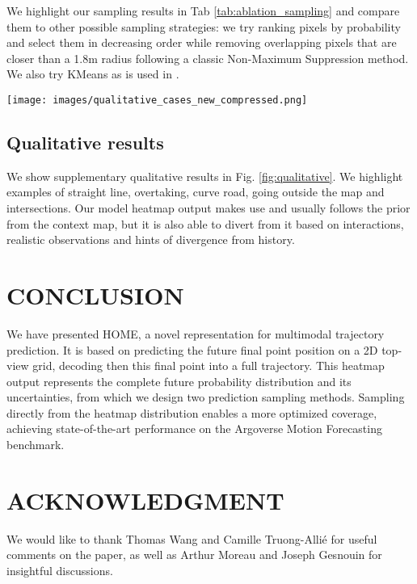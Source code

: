 \documentclass[letterpaper, 10 pt, conference]{ieeeconf}
\begin{document}
We highlight our sampling results in Tab \ref{tab:ablation_sampling} and compare them to other possible sampling strategies: we try ranking pixels by probability and select them in decreasing order while removing overlapping pixels that are closer than a 1.8m radius following a classic Non-Maximum Suppression method. We also try KMeans as is used in \cite{mangalam2020goals}.






\begin{figure*}[b]
\centerline{\texttt{[image: images/qualitative\_cases\_new\_compressed.png]}}
\caption{Qualitative examples. The yellow/red heatmap is our predicted probability distribution and the blue points are the sampled final point predictions. The ground truth trajectory is shown in green.}
\label{fig:qualitative}
\end{figure*}


\subsection{Qualitative results}

We show supplementary qualitative results in Fig. \ref{fig:qualitative}. We highlight examples of straight line, overtaking, curve road, going outside the map and intersections. Our model heatmap output makes use and usually follows the prior from the context map, but it is also able to divert from it based on interactions, realistic observations and hints of divergence from history.

\section{CONCLUSION}

We have presented HOME, a novel representation for multimodal trajectory prediction. It is based on predicting the future final point position on a 2D top-view grid, decoding then this final point into a full trajectory. This heatmap output represents the complete future probability distribution and its uncertainties, from which we design two prediction sampling methods. Sampling directly from the heatmap distribution enables a more optimized coverage, achieving state-of-the-art performance on the Argoverse Motion Forecasting benchmark.














\section*{ACKNOWLEDGMENT}

We would like to thank Thomas Wang and Camille Truong-Allié for useful comments on the paper, as well as Arthur Moreau and Joseph Gesnouin for insightful discussions.









\printbibliography
\end{document}
